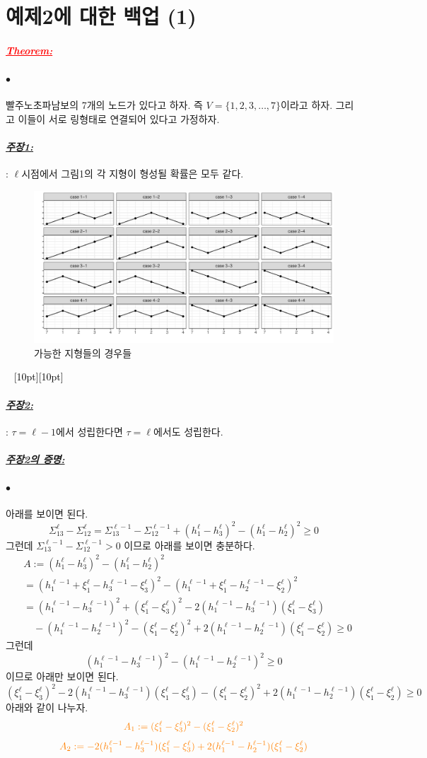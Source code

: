 \documentclass[12pt,oneside,english,a4paper]{article}
\newcommand{\dash}{\noindent \newline\textcolor{black}{\hrulefill~ \raisebox{-2.5pt}[10pt][10pt]{\leafright \decofourleft \decothreeleft  \aldineright \decotwo \floweroneleft \decoone   \floweroneright \decotwo \aldineleft\decothreeright \decofourright \leafleft} ~  \hrulefill}}
\def\ck{\paragraph{\Large$\bullet$}\Large}
\newcommand{\para}[1]{\paragraph{\Large\it\underline{\textbf{#1:}}}\Large}
\newcommand{\parared}[1]{\paragraph{\Large\textcolor{red}{\it\underline{\textbf{#1:}}}}\Large}
\begin{document}
\section{예제2에 대한 백업 (1)}
\parared{Theorem}
\ck 빨주노초파남보의 7개의 노드가 있다고 하자. 즉 $V=\{1,2,3,\dots,7\}$이라고 하자. 그리고 이들이 서로 링형태로 연결되어 있다고 가정하자. 

\para{주장1}: $\ell$시점에서 그림1의 각 지형이 형성될 확률은 모두 같다. 

\begin{figure}[h]
\center
\includegraphics[width=1\textwidth]{Fig1.pdf}
\caption{가능한 지형들의 경우들}
\end{figure}
\dash

\para{주장2}: $\tau=\ell-1$에서 성립한다면 $\tau=\ell$에서도 성립한다. 

\para{주장2의 증명}
\ck 아래를 보이면 된다. 
\[
\Sigma_{13}^{\ell}-\Sigma_{12}^{\ell}=\Sigma_{13}^{\ell-1}-\Sigma_{12}^{\ell-1}+(h_{1}^{\ell}-h_3^{\ell})^2-(h_{1}^{\ell}-h_2^{\ell})^2\geq 0
\]
그런데 $\Sigma_{13}^{\ell-1}-\Sigma_{12}^{\ell-1}>0$ 이므로 아래를 보이면 충분하다. 
\begin{align*}
& A:=(h_{1}^{\ell}-h_3^{\ell})^2-(h_{1}^{\ell}-h_2^{\ell})^2 \\
& =(h_1^{\ell-1}+\xi_{1}^{\ell}-h_3^{\ell-1}-\xi_3^{\ell})^2-(h_1^{\ell-1}+\xi_{1}^{\ell}-h_2^{\ell-1}-\xi_2^{\ell})^2 \\ 
& =(h_1^{\ell-1}-h_3^{\ell-1})^2+(\xi_1^{\ell}-\xi_3^{\ell})^2-2(h_1^{\ell-1}-h_3^{\ell-1})(\xi_1^{\ell}-\xi_3^{\ell}) \\
&\quad - (h_1^{\ell-1}-h_2^{\ell-1})^2-(\xi_1^{\ell}-\xi_2^{\ell})^2+2(h_1^{\ell-1}-h_2^{\ell-1})(\xi_1^{\ell}-\xi_2^{\ell})\geq 0
\end{align*}
그런데 
\[
(h_1^{\ell-1}-h_3^{\ell-1})^2-(h_1^{\ell-1}-h_2^{\ell-1})^2 \geq 0 
\]
이므로 아래만 보이면 된다. 
\[
(\xi_1^{\ell}-\xi_3^{\ell})^2-2(h_1^{\ell-1}-h_3^{\ell-1})(\xi_1^{\ell}-\xi_3^{\ell})-(\xi_1^{\ell}-\xi_2^{\ell})^2+2(h_1^{\ell-1}-h_2^{\ell-1})(\xi_1^{\ell}-\xi_2^{\ell})\geq 0
\]
아래와 같이 나누자. 
\[
\textcolor{orange}{A_1:=(\xi_1^{\ell}-\xi_3^{\ell})^2-(\xi_1^{\ell}-\xi_2^{\ell})^2}
\]
\[
\textcolor{orange}{A_2:=-2(h_1^{\ell-1}-h_3^{\ell-1})(\xi_1^{\ell}-\xi_3^{\ell})+2(h_1^{\ell-1}-h_2^{\ell-1})(\xi_1^{\ell}-\xi_2^{\ell})}
\]
\end{document}
